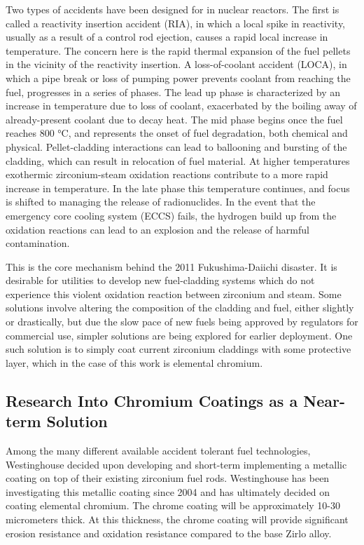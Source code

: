 \documentclass{article}
\begin{document}
Two types of accidents have been designed for in nuclear reactors. The first is called a reactivity insertion accident (RIA), in which a local spike in reactivity, usually as a result of a control rod ejection, causes a rapid local increase in temperature. The concern here is the rapid thermal expansion of the fuel pellets in the vicinity of the reactivity insertion\cite{Zinkle:1}. A loss-of-coolant accident (LOCA), in which a pipe break or loss of pumping power prevents coolant from reaching the fuel, progresses in a series of phases. The lead up phase is characterized by an increase in temperature due to loss of coolant, exacerbated by the boiling away of already-present coolant due to decay heat. The mid phase begins once the fuel reaches 800 °C, and represents the onset of fuel degradation, both chemical and physical. Pellet-cladding interactions can lead to ballooning and bursting of the cladding, which can result in relocation of fuel material. At higher temperatures exothermic zirconium-steam oxidation reactions contribute to a more rapid increase in temperature. In the late phase this temperature continues, and focus is shifted to managing the release of radionuclides. In the event that the emergency core cooling system (ECCS) fails, the hydrogen build up from the oxidation reactions can lead to an explosion and the release of harmful contamination\cite{Zinkle:1}.

This is the core mechanism behind the 2011 Fukushima-Daiichi disaster. It is desirable for utilities to develop new fuel-cladding systems which do not experience this violent oxidation reaction between zirconium and steam. Some solutions involve altering the composition of the cladding and fuel, either slightly or drastically, but due the slow pace of new fuels being approved by regulators for commercial use, simpler solutions are being explored for earlier deployment. One such solution is to simply coat current zirconium claddings with some protective layer, which in the case of this work is elemental chromium.

\subsection*{Research Into Chromium Coatings as a Near-term Solution}

Among the many different available accident tolerant fuel technologies, Westinghouse decided upon developing and short-term implementing a metallic coating on top of their existing zirconium fuel rods.  Westinghouse has been investigating this metallic coating since 2004 and has ultimately decided on coating elemental chromium.  The chrome coating will be approximately 10-30 micrometers thick.  At this thickness, the chrome coating will provide significant erosion resistance and oxidation resistance compared to the base Zirlo alloy. 
 
\end{document}
